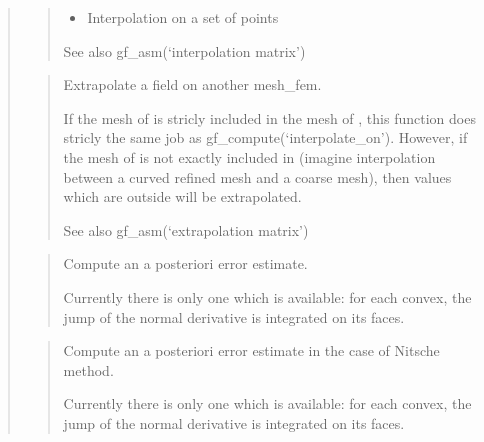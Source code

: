 \documentclass[a4paper,11pt,english]{sphinxmanual}
\begin{document}
\begin{quote}
\begin{quote}
\begin{itemize}
\begin{description}
\end{description}

\item {} 
Interpolation on a set of points 

\end{itemize}

See also gf\_asm(‘interpolation matrix’)
\end{quote}

\begin{quote}

Extrapolate a field on another mesh\_fem.

If the mesh of  is stricly included in the mesh of , this
function does stricly the same job as gf\_compute(‘interpolate\_on’).
However, if the mesh of  is not exactly included in 
(imagine interpolation between a curved refined mesh and a coarse
mesh), then values which are outside  will be
extrapolated.

See also gf\_asm(‘extrapolation matrix’)
\end{quote}

\begin{quote}

Compute an a posteriori error estimate.

Currently there is only one which is available: for each convex,
the jump of the normal derivative is integrated on its faces.
\end{quote}

\begin{quote}

Compute an a posteriori error estimate in the case of Nitsche method.

Currently there is only one which is available: for each convex,
the jump of the normal derivative is integrated on its faces.
\end{quote}

\begin{quote}


\end{quote}
\end{quote}
\end{document}
